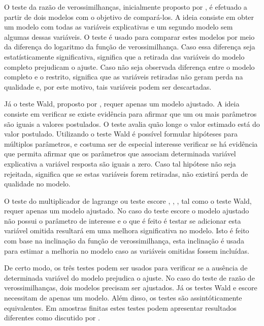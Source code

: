 O teste da razão de verossimilhanças, inicialmente proposto por \citet{trv}, é efetuado a partir de dois modelos com o objetivo de compará-los. A ideia consiste em obter um modelo com todas as variáveis explicativas e um segundo modelo sem algumas dessas variáveis. O teste é usado para comparar estes modelos por meio da diferença do logaritmo da função de verossimilhança. Caso essa diferença seja estatísticamente significativa, significa que a retirada das variáveis do modelo completo prejudicam o ajuste. Caso não seja observada diferença entre o modelo completo e o restrito, significa que as variáveis retiradas não geram perda na qualidade e, por este motivo, tais variáveis podem ser descartadas.

Já o teste Wald, proposto por \citet{wald}, requer apenas um modelo ajustado. A ideia consiste em verificar se existe evidência para afirmar que um ou mais parâmetros são iguais a valores postulados. O teste avalia quão longe o valor estimado está do valor postulado. Utilizando o teste Wald é possível formular hipóteses para múltiplos parâmetros, e costuma ser de especial interesse verificar se há evidência que permita afirmar que os parâmetros que associam determinada variável explicativa a variável resposta são iguais a zero. Caso tal hipótese não seja rejeitada, significa que se estas variáveis forem retiradas, não existirá perda de qualidade no modelo.

O teste do multiplicador de lagrange ou teste escore \citep{score1}, \citep{score2}, \citep{score3}, tal como o teste Wald, requer apenas um modelo ajustado. No caso do teste escore o modelo ajustado não possui o parâmetro de interesse e o que é feito é testar se adicionar esta variável omitida resultará em uma melhora significativa no modelo. Isto é feito com base na inclinação da função de verossimilhança, esta inclinação é usada para estimar a melhoria no modelo caso as variáveis omitidas fossem incluídas.

De certo modo, os três testes podem ser usados para verificar se a ausência de determinada variável do modelo prejudica o ajuste. No caso do teste de razão de verossimilhanças, dois modelos precisam ser ajustados. Já os testes Wald e escore necessitam de apenas um modelo. Além disso, os testes são assintóticamente equivalentes. Em amostras finitas estes testes podem apresentar resultados diferentes como discutido por \citet{conflict}.


